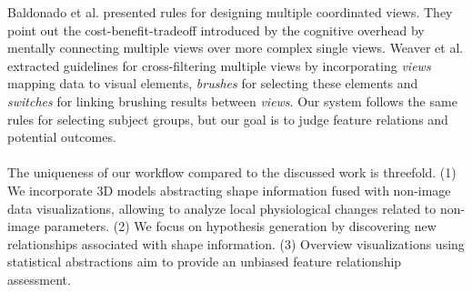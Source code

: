 \documentclass[journal]{style/vgtc} 			          %
\begin{document}
Baldonado et al. \cite{Baldonado2000} presented rules for designing multiple coordinated views.
%
They point out the cost-benefit-tradeoff introduced by the cognitive overhead by mentally connecting multiple views over more complex single views. %
%
Weaver et al. \cite{Weaver2010} extracted guidelines for cross-filtering multiple views by incorporating \emph{views} mapping data to visual elements, \emph{brushes} for selecting these elements and \emph{switches} for linking brushing results between \emph{views}.
%
Our system follows the same rules for selecting subject groups, but our goal is to judge feature relations and potential outcomes.
\\\\
The uniqueness of our workflow compared to the discussed work is threefold.
%
(1) We incorporate 3D models abstracting shape information fused with non-image data visualizations, allowing to analyze local physiological changes related to non-image parameters.
%
(2) We focus on hypothesis generation by discovering new relationships associated with shape information. %
%
(3) Overview visualizations using statistical abstractions aim to provide an unbiased feature relationship assessment.

\end{document}
